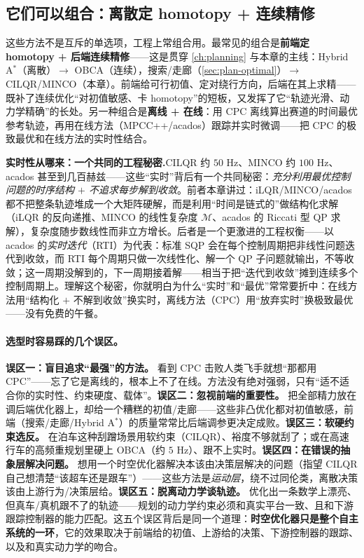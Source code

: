 \subsection{它们可以组合：离散定 homotopy + 连续精修}
\label{sec:st-select-combine}

这些方法不是互斥的单选项，工程上常组合用。最常见的组合是\textbf{前端定 homotopy + 后端连续精修}——这是贯穿 \cref{ch:planning} 与本章的主线：Hybrid A$^*$（离散）$\to$ OBCA（连续），搜索/走廊（\cref{sec:plan-optimal}）$\to$ CILQR/MINCO（本章）。前端给可行初值、定对绕行方向，后端在其上求精——既补了连续优化“对初值敏感、卡 homotopy”的短板，又发挥了它“轨迹光滑、动力学精确”的长处。另一种组合是\textbf{离线 + 在线}：用 CPC 离线算出赛道的时间最优参考轨迹，再用在线方法（MPCC++/acados）跟踪并实时微调——把 CPC 的极致最优和在线方法的实时性结合。

\begin{insight}
\textbf{实时性从哪来：一个共同的工程秘密.}\;CILQR 约 $50$ Hz、MINCO 约 $100$ Hz、acados 甚至到几百赫兹——这些“实时”背后有一个共同秘密：\emph{充分利用最优控制问题的时序结构 $+$ 不追求每步解到收敛}。前者本章讲过：iLQR/MINCO/acados 都不把整条轨迹堆成一个大矩阵硬解，而是利用“时间是链式的”做结构化求解（iLQR 的反向递推、MINCO 的线性复杂度 $\mathcal M$、acados 的 Riccati 型 QP 求解），复杂度随步数线性而非立方增长。后者是一个更激进的工程权衡——以 acados 的\emph{实时迭代}（RTI）为代表：标准 SQP 会在每个控制周期把非线性问题迭代到收敛，而 RTI 每个周期只做一次线性化、解一个 QP 子问题就输出，不等收敛；这一周期没解到的，下一周期接着解——相当于把“迭代到收敛”摊到连续多个控制周期上。理解这个秘密，你就明白为什么“实时”和“最优”常常要折中：在线方法用“结构化 $+$ 不解到收敛”换实时，离线方法（CPC）用“放弃实时”换极致最优——没有免费的午餐。
\end{insight}

\paragraph{选型时容易踩的几个误区。}
\textbf{误区一：盲目追求“最强”的方法。} 看到 CPC 击败人类飞手就想“那都用 CPC”——忘了它是离线的，根本上不了在线。方法没有绝对强弱，只有“适不适合你的实时性、约束硬度、载体”。\textbf{误区二：忽视前端的重要性。} 把全部精力放在调后端优化器上，却给一个糟糕的初值/走廊——这些非凸优化都对初值敏感，前端（搜索/走廊/Hybrid A$^*$）的质量常常比后端调参更决定成败。\textbf{误区三：软硬约束选反。} 在泊车这种刮蹭场景用软约束（CILQR）、裕度不够就刮了；或在高速行车的高频重规划里硬上 OBCA（约 $5$ Hz）、跟不上实时。\textbf{误区四：在错误的抽象层解决问题。} 想用一个时空优化器解决本该由决策层解决的问题（指望 CILQR 自己想清楚“该超车还是跟车”）——这些方法是\emph{运动层}，绕不过同伦类，离散决策该由上游行为/决策层给。\textbf{误区五：脱离动力学谈轨迹。} 优化出一条数学上漂亮、但真车/真机跟不了的轨迹——规划的动力学约束必须和真实平台一致、且和下游跟踪控制器的能力匹配。这五个误区背后是同一个道理：\textbf{时空优化器只是整个自主系统的一环}，它的效果取决于前端给的初值、上游给的决策、下游控制器的跟踪、以及和真实动力学的吻合。

